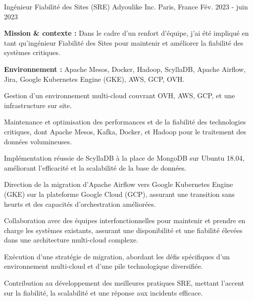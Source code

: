\begin{cventries}
{\begin{cvitems}
{%
\cventry
{Ingénieur Fiabilité des Sites (SRE)} %
{Adyoulike Inc.} %
{Paris, France} %
{Fév. 2023 - juin 2023} %
{
  \begin{cvitems} %
    \item {\textbf{Mission \& contexte :} Dans le cadre d'un renfort d'équipe, j'ai été impliqué en tant qu'ingénieur Fiabilité des Sites pour maintenir et améliorer la fiabilité des systèmes critiques.}
    \item {\textbf{Environnement :} Apache Mesos, Docker, Hadoop, ScyllaDB, Apache Airflow, Jira, Google Kubernetes Engine (GKE), AWS, GCP, OVH.}
    \item {Gestion d'un environnement multi-cloud couvrant OVH, AWS, GCP, et une infrastructure sur site.}
    \item {Maintenance et optimisation des performances et de la fiabilité des technologies critiques, dont Apache Mesos, Kafka, Docker, et Hadoop pour le traitement des données volumineuses.}
    \item {Implémentation réussie de ScyllaDB à la place de MongoDB sur Ubuntu 18.04, améliorant l'efficacité et la scalabilité de la base de données.}
    \item {Direction de la migration d'Apache Airflow vers Google Kubernetes Engine (GKE) sur la plateforme Google Cloud (GCP), assurant une transition sans heurts et des capacités d'orchestration améliorées.}
    \item {Collaboration avec des équipes interfonctionnelles pour maintenir et prendre en charge les systèmes existants, assurant une disponibilité et une fiabilité élevées dans une architecture multi-cloud complexe.}
    \item {Exécution d'une stratégie de migration, abordant les défis spécifiques d'un environnement multi-cloud et d'une pile technologique diversifiée.}
    \item {Contribution au développement des meilleures pratiques SRE, mettant l'accent sur la fiabilité, la scalabilité et une réponse aux incidents efficace.}
  \end{cvitems}
}

}
\end{cvitems}}
\end{cventries}
